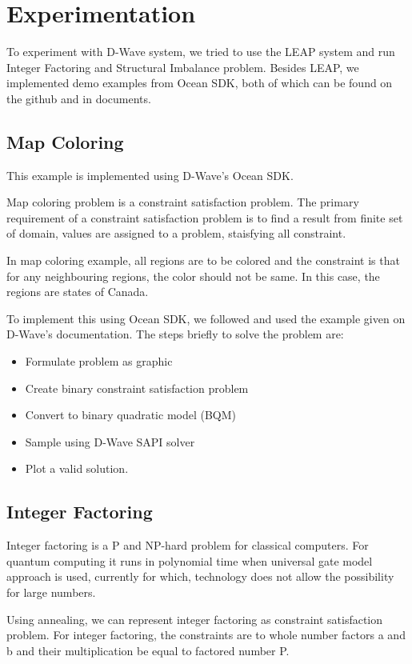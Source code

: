 \documentclass[12pt,conference]{IEEEtran}
\begin{document}
\section{Experimentation}
To experiment with D-Wave system, we tried to use the LEAP system and run Integer Factoring and Structural Imbalance problem. Besides LEAP, we implemented demo examples from Ocean SDK, both of which can be found on the github\cite{6} and in documents\cite{7}.


\subsection{Map Coloring}
This example is implemented using D-Wave's Ocean SDK. 

Map coloring problem is a constraint satisfaction problem. The primary requirement of a constraint satisfaction problem is to find a result from finite set of domain, values are assigned to a problem, staisfying all constraint. 

In map coloring example, all regions are to be colored and the constraint is that for any neighbouring regions, the color should not be same. In this case, the regions are states of Canada.

To implement this using Ocean SDK, we followed and used the example given on D-Wave's documentation\cite{7}. The steps briefly to solve the problem are: 

\begin{itemize}
  \item Formulate problem as graphic
  \item Create binary constraint satisfaction problem
  \item Convert to binary quadratic model (BQM)
  \item Sample using D-Wave SAPI solver
  \item Plot a valid solution.
\end{itemize}

\subsection{Integer Factoring}
Integer factoring is a P and NP-hard problem for classical computers. For quantum computing it runs in polynomial time when universal gate model approach is used, currently for which, technology does not allow the possibility for large numbers.

Using annealing, we can represent integer factoring as constraint satisfaction problem. For integer factoring, the constraints are to whole number factors a and b and their multiplication be equal to factored number P.
\end{document}
